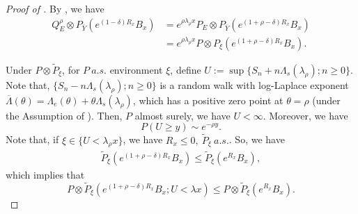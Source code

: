 \documentclass[10pt,a4paper]{amsart}
\begin{document}
	\begin{proof}[Proof of ]
	By , we have
	\begin{align}
		Q^\rho_E\otimes P_{\overline{Y}} \left(
		e^{(1-\delta)R_x} B_x
		\right) &= 
		e^{\rho\lambda_\rho x}P_E\otimes P_{\overline{Y}} \left(
		e^{(1+\rho-\delta) R_x} B_x
		\right)
		\nonumber\\
		&= e^{\rho\lambda_\rho x}
		P\otimes P_{\xi} \left( e^{(1+\rho-\delta) R_x} B_x \right).
	\end{align}
	
	Under $P\otimes \tilde{P}_\xi$, 
	for $P~a.s.$ environment $\xi$, 
	define $U:=\sup\{S_n+n\Lambda_s(\lambda_\rho);n\geqslant 0\}$.
	Note that, $\{S_n-n\Lambda_s(\lambda_\rho);n\geqslant 0\}$ is a random walk with log-Laplace exponent $ \overline{\Lambda}(\theta)=\Lambda_e(\theta)+\theta \Lambda_s(\lambda_\rho) $, which has a positive zero point at $\theta=\rho$ (under the Assumption of ).
	Then, $P$ almost surely, we have $U<\infty$. 
	Moreover, we have
	\begin{equation*}
		P(U\geqslant y) \sim e^{-\rho y}.
	\end{equation*}
	Note that, if $\xi\in \{U <\lambda_\rho x\}$, we have $R_x\leqslant 0,~ \tilde{P}_\xi~a.s.$. So, we have
	\begin{align*}
		\tilde{P}_\xi(e^{(1+\rho-\delta)R_x}B_x)
		\leqslant\tilde{P}_\xi(e^{R_x}B_x),
	\end{align*}
	which implies that
	\begin{equation*}
		P\otimes \tilde{P}_\xi (e^{(1+\rho-\delta)R_x}B_x;U<\lambda x)\leqslant
		P\otimes \tilde{P}_\xi (e^{R_x}B_x).
	\end{equation*}
	

\end{proof}
\end{document}
